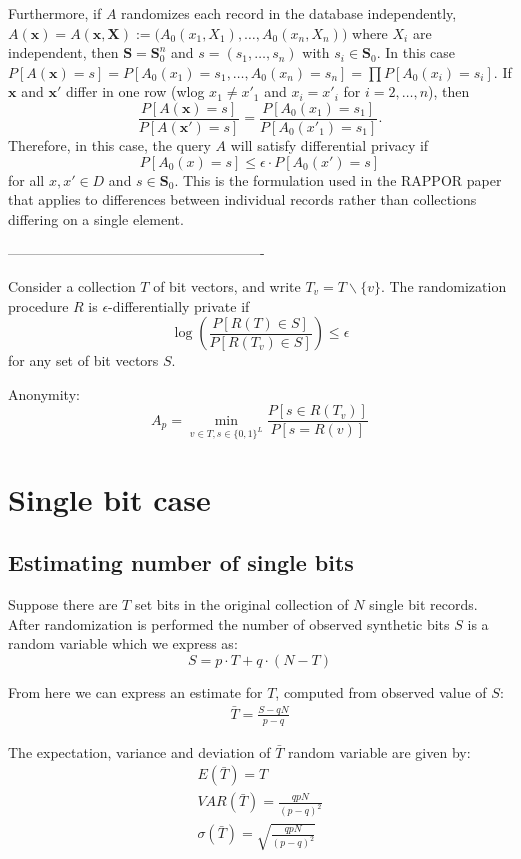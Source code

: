 \documentclass[11pt,draft]{article}
\begin{document}
Furthermore, if $A$ randomizes each record in the database independently,
\ie $A(\boldsymbol{x}) = A(\boldsymbol{x}, \boldsymbol{X}) := 
\big(A_0(x_1, X_1),\dots,A_0(x_n,X_n)\big)$ where $X_i$ are independent,
then $\boldsymbol{S} = \boldsymbol{S}_0^n$ and $s = (s_1,\dots,s_n)$ with 
$s_i \in \boldsymbol{S}_0$. 
In this case $P[A(\boldsymbol{x}) = s] = 
P[A_0(x_1) = s_1,\dots,A_0(x_n) = s_n] = \prod P[A_0(x_i) = s_i]$.
If $\boldsymbol{x}$ and $\boldsymbol{x'}$ differ in one row (wlog 
$x_1 \neq x'_1$ and $x_i = x'_i$ for $i = 2,\dots,n$), then
\[ \frac{P[A(\boldsymbol{x}) = s]}{P[A(\boldsymbol{x'}) = s]} = 
\frac{P[A_0(x_1) = s_1]}{P[A_0(x'_1) = s_1]}. \]
Therefore, in this case, the query $A$ will satisfy differential privacy if
\[ P[A_0(x) = s] \leq \epsilon \cdot P[A_0(x') = s] \] for all $x,x' \in D$
and $s \in \boldsymbol{S}_0$.
This is the formulation used in the RAPPOR paper that applies to differences
between individual records rather than collections differing on a single element.


-------------------------------------------------------

Consider a collection $T$ of bit vectors, and write $T_v = T\backslash\{v\}$.
The randomization procedure $R$ is $\epsilon$-differentially private if
\[ \log\left(\frac{P[R(T)\in S]}{P[R(T_v)\in S]}\right) \leq \epsilon \]
for any set of bit vectors $S$.

Anonymity:
\[
    A_p = \min_{v \in T, s \in \{0,1\}^L} \frac{P[s \in R(T_v)]}{P[s = R(v)]}
\]

\section{Single bit case}

\subsection{Estimating number of single bits}

Suppose there are $T$ set bits in the original collection of $N$ single bit records. After randomization is performed the number of observed synthetic bits $S$ is a random variable which we express as:
\[ S = p \cdot T + q \cdot (N-T) \]

From here we can express an estimate for $T$, computed from observed value of $S$:
\begin{align}
\bar{T} = \frac{S-qN}{p-q}
\end{align}

The expectation, variance and deviation of $\bar{T}$ random variable are given by:
\begin{align}
E(\bar{T}) = T\\
VAR(\bar{T}) = \frac{qpN}{(p-q)^2} \\
\sigma(\bar{T}) = \sqrt{\frac{qpN}{(p-q)^2}}
\end{align}
\end{document}
